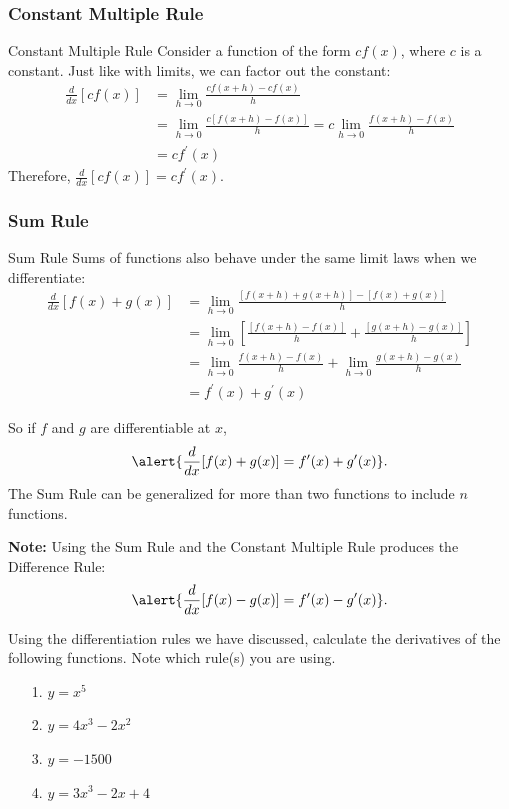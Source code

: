 \documentclass[cal1spr16Lectures.tex]{subfiles}
\begin{document}
\subsubsection{Constant Multiple Rule}

\begin{frame}{\small Constant Multiple Rule}
Consider a function of the form $cf(x)$, where $c$ is a constant.  Just like with limits, we can factor out the constant: 
\begin{align*}
\frac{d}{dx}[cf(x)] &= \lim_{h \to 0} \frac{cf(x+h)-cf(x)}{h} \\
&= \lim_{h \to 0} \frac{c[f(x+h)-f(x)]}{h} = c\lim_{h \to 0} \frac{f(x+h)-f(x)}{h} \\[0.25pc]
&= cf^{\prime}(x)
\end{align*}
Therefore, \alert{$\frac{d}{dx}[cf(x)]=cf^{\prime}(x)$}.
\end{frame}

\subsubsection{Sum Rule}

\begin{frame}{\small Sum Rule}
Sums of functions also behave under the same limit laws when we differentiate:
\begin{align*}
\frac{d}{dx}[f(x)+g(x)] &= \lim_{h \to 0} \frac{[f(x+h)+g(x+h)]-[f(x)+g(x)]}{h} \\
&= \lim_{h \to 0} \left[\frac{[f(x+h)-f(x)]}{h}+\frac{[g(x+h)-g(x)]}{h}\right] \\[0.25pc]
&= \lim_{h \to 0} \frac{f(x+h)-f(x)}{h}+ \lim_{h \to 0}\frac{g(x+h)-g(x)}{h} \\[0.25pc]
&= f^{\prime}(x)+g^{\prime}(x)
\end{align*}
\end{frame}

\begin{frame}{}
So if $f$ and $g$ are differentiable at $x$,
\[\alert{\frac{d}{dx}[f(x)+g(x)]=f^{\prime}(x)+g^{\prime}(x)}.\]
The Sum Rule can be generalized for more than two functions to include $n$ functions.

\vspace{1pc}
{\bf Note:}  Using the Sum Rule and the Constant Multiple Rule produces the Difference Rule:
\[\alert{\frac{d}{dx}[f(x)-g(x)]=f^{\prime}(x)-g^{\prime}(x)}.\]
\end{frame}

\begin{frame}
\begin{exe}Using the differentiation rules we have discussed, calculate the derivatives of the following functions.  Note which rule(s) you are using.
\begin{itemize}
\item[1.] $y=x^5$
\item[2.] $y=4x^3-2x^2$
\item[3.] $y=-1500$
\item[4.] $y=3x^3-2x+4$
\end{itemize}
\end{exe}
\end{frame}
\end{document}
